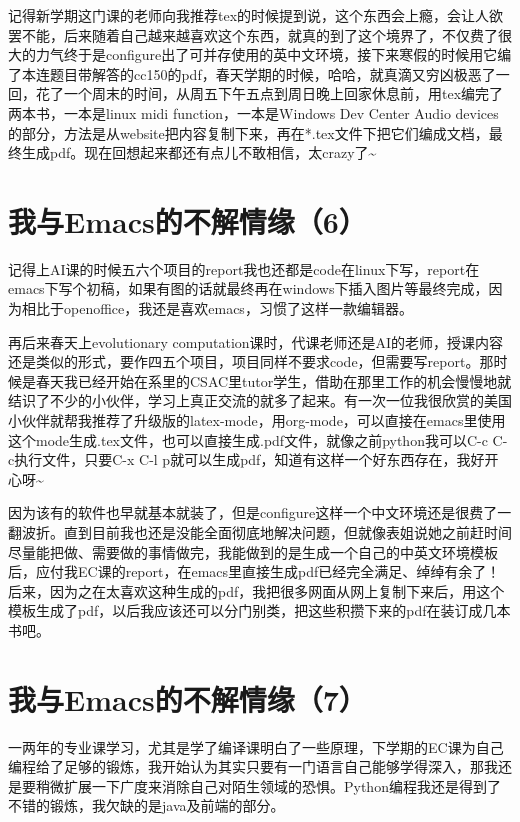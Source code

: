 \documentclass[12pt]{book}
\begin{document}
记得新学期这门课的老师向我推荐tex的时候提到说，这个东西会上瘾，会让人欲罢不能，后来随着自己越来越喜欢这个东西，就真的到了这个境界了，不仅费了很大的力气终于是configure出了可并存使用的英中文环境，接下来寒假的时候用它编了本连题目带解答的cc150的pdf，春天学期的时候，哈哈，就真滴又穷凶极恶了一回，花了一个周末的时间，从周五下午五点到周日晚上回家休息前，用tex编完了两本书，一本是linux midi function，一本是Windows Dev Center Audio devices的部分，方法是从website把内容复制下来，再在*.tex文件下把它们编成文档，最终生成pdf。现在回想起来都还有点儿不敢相信，太crazy了\textasciitilde{}~


\section{我与Emacs的不解情缘（6）}
\label{sec-6-6}

记得上AI课的时候五六个项目的report我也还都是code在linux下写，report在emacs下写个初稿，如果有图的话就最终再在windows下插入图片等最终完成，因为相比于openoffice，我还是喜欢emacs，习惯了这样一款编辑器。

再后来春天上evolutionary computation课时，代课老师还是AI的老师，授课内容还是类似的形式，要作四五个项目，项目同样不要求code，但需要写report。那时候是春天我已经开始在系里的CSAC里tutor学生，借助在那里工作的机会慢慢地就结识了不少的小伙伴，学习上真正交流的就多了起来。有一次一位我很欣赏的美国小伙伴就帮我推荐了升级版的latex-mode，用org-mode，可以直接在emacs里使用这个mode生成.tex文件，也可以直接生成.pdf文件，就像之前python我可以C-c C-c执行文件，只要C-x C-l p就可以生成pdf，知道有这样一个好东西存在，我好开心呀\textasciitilde{}~

因为该有的软件也早就基本就装了，但是configure这样一个中文环境还是很费了一翻波折。直到目前我也还是没能全面彻底地解决问题，但就像表姐说她之前赶时间尽量能把做、需要做的事情做完，我能做到的是生成一个自己的中英文环境模板后，应付我EC课的report，在emacs里直接生成pdf已经完全满足、绰绰有余了！后来，因为之在太喜欢这种生成的pdf，我把很多网面从网上复制下来后，用这个模板生成了pdf，以后我应该还可以分门别类，把这些积攒下来的pdf在装订成几本书吧。


\section{我与Emacs的不解情缘（7）}
\label{sec-6-7}

一两年的专业课学习，尤其是学了编译课明白了一些原理，下学期的EC课为自己编程给了足够的锻炼，我开始认为其实只要有一门语言自己能够学得深入，那我还是要稍微扩展一下广度来消除自己对陌生领域的恐惧。Python编程我还是得到了不错的锻炼，我欠缺的是java及前端的部分。
\end{document}
